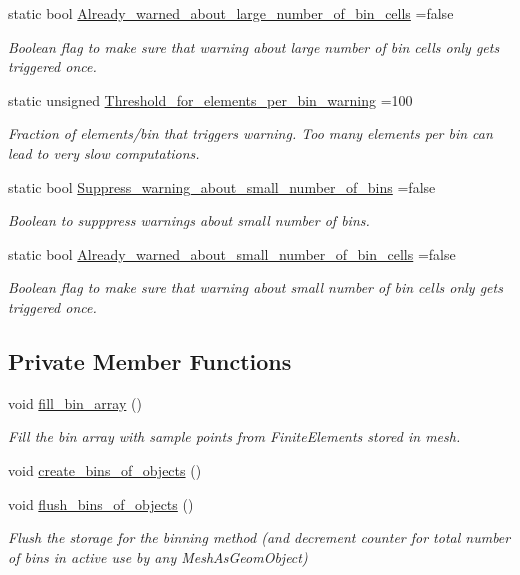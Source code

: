 \begin{DoxyCompactItemize}
static bool \hyperlink{classNonRefineableBinArray_a9f65e36e36025d0060040bf5109dcc24}{Already\+\_\+warned\+\_\+about\+\_\+large\+\_\+number\+\_\+of\+\_\+bin\+\_\+cells} =false
\begin{DoxyCompactList}\small\item\em Boolean flag to make sure that warning about large number of bin cells only gets triggered once. \end{DoxyCompactList}\item 
static unsigned \hyperlink{classNonRefineableBinArray_a2ba9c40401772ed01cafa58b84861d2e}{Threshold\+\_\+for\+\_\+elements\+\_\+per\+\_\+bin\+\_\+warning} =100
\begin{DoxyCompactList}\small\item\em Fraction of elements/bin that triggers warning. Too many elements per bin can lead to very slow computations. \end{DoxyCompactList}\item 
static bool \hyperlink{classNonRefineableBinArray_a4ef6aaf738c73b6ea2b490ac42df70c1}{Suppress\+\_\+warning\+\_\+about\+\_\+small\+\_\+number\+\_\+of\+\_\+bins} =false
\begin{DoxyCompactList}\small\item\em Boolean to supppress warnings about small number of bins. \end{DoxyCompactList}\item 
static bool \hyperlink{classNonRefineableBinArray_a00af6975c82a55816e96d63f73a2ae6b}{Already\+\_\+warned\+\_\+about\+\_\+small\+\_\+number\+\_\+of\+\_\+bin\+\_\+cells} =false
\begin{DoxyCompactList}\small\item\em Boolean flag to make sure that warning about small number of bin cells only gets triggered once. \end{DoxyCompactList}\end{DoxyCompactItemize}
\subsection*{Private Member Functions}
\begin{DoxyCompactItemize}
\item 
void \hyperlink{classNonRefineableBinArray_a092b4de479924b7c13800cdae75ad5db}{fill\+\_\+bin\+\_\+array} ()
\begin{DoxyCompactList}\small\item\em Fill the bin array with sample points from Finite\+Elements stored in mesh. \end{DoxyCompactList}\item 
void \hyperlink{classNonRefineableBinArray_a09b3807d836620c55ad7febdfc81bd93}{create\+\_\+bins\+\_\+of\+\_\+objects} ()
\item 
void \hyperlink{classNonRefineableBinArray_acf0ff698280d40cf44a637d7df31cf90}{flush\+\_\+bins\+\_\+of\+\_\+objects} ()
\begin{DoxyCompactList}\small\item\em Flush the storage for the binning method (and decrement counter for total number of bins in active use by any Mesh\+As\+Geom\+Object) \end{DoxyCompactList}\end{DoxyCompactItemize}
